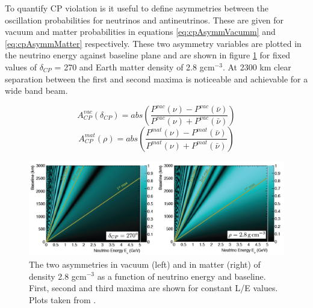 To quantify CP violation is it useful to define asymmetries between the oscillation probabilities for neutrinos and antineutrinos. These are given for vacuum and matter probabilities in equations \ref{eq:cpAsymmVacumm} and \ref{eq:cpAsymmMatter} respectively. These two asymmetry variables are plotted in the neutrino energy against baseline plane and are shown in figure \ref{fig:cpvSensitivity} \cite{lbnoEoI} for fixed values of $\delta_{CP}$ = 270 \textdegree and Earth matter density of 2.8 gcm$^{-3}$. At 2300 km clear separation between the first and second maxima is noticeable and achievable for a wide band beam.

\begin{equation}
	A_{CP}^{vac}(\delta_{CP}) = abs \left(\frac{P^{vac}(\nu) - P^{vac}(\bar{\nu})}{P^{vac}(\nu) + P^{vac}(\bar{\nu})}\right)
	\label{eq:cpAsymmVacumm}
\end{equation}
\begin{equation}
	A_{CP}^{mat}(\rho) = abs \left(\frac{P^{mat}(\nu) - P^{mat}(\bar{\nu})}{P^{mat}(\nu) + P^{mat}(\bar{\nu})}\right)
	\label{eq:cpAsymmMatter}
\end{equation}

\begin{figure}[htbp]
\begin{center}
\includegraphics[width=160mm]{Chapter2/figures/cpvSensitivity.png}
\caption{The two asymmetries in vacuum (left) and in matter (right) of density 2.8 gcm$^{-3}$ as a function of neutrino energy and baseline. First, second and third maxima are shown for constant L/E values. Plots taken from \cite{lbnoEoI}. }
\label{fig:cpvSensitivity}
\end{center}
\end{figure}

